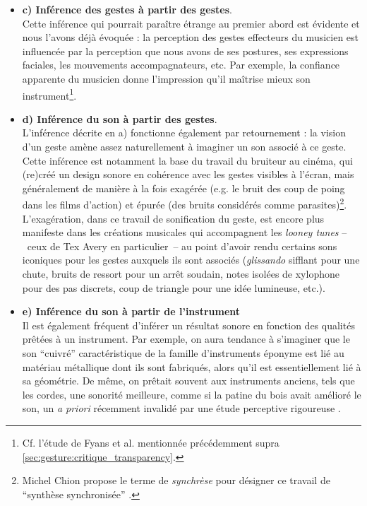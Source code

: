 \begin{itemize}[noitemsep]
	\item \textbf{c) Inférence des gestes à partir des gestes}.\\
	Cette inférence qui pourrait paraître étrange au premier abord est évidente et nous l'avons déjà évoquée : la perception des gestes effecteurs du musicien est influencée par la perception que nous avons de ses postures, ses expressions faciales, les mouvements accompagnateurs, etc. Par exemple, la confiance apparente du musicien donne l'impression qu'il maîtrise mieux son instrument\footnote{Cf. l'étude de Fyans et al. mentionnée précédemment supra \ref{sec:gesture:critique_transparency}.}.

	\item \textbf{d) Inférence du son à partir des gestes}.\\
	L'inférence décrite en a) fonctionne également par retournement : la vision d'un geste amène assez naturellement à imaginer un son associé à ce geste. Cette inférence est notamment la base du travail du bruiteur au cinéma, qui (re)créé un design sonore en cohérence avec les gestes visibles à l'écran, mais généralement de manière à la fois exagérée (e.g. le bruit des coup de poing dans les films d'action) et épurée (des bruits considérés comme parasites)\footnote{Michel Chion propose le terme de \textit{synchrèse} pour désigner ce travail de ``synthèse synchronisée'' \cite{chion_audio-vision:_2013}.}. L'exagération, dans ce travail de sonification du geste, est encore plus manifeste dans les créations musicales qui accompagnent les \textit{looney tunes} --~ceux de Tex Avery en particulier~-- au point d'avoir rendu certains sons iconiques pour les gestes auxquels ils sont associés (\textit{glissando} sifflant pour une chute, bruits de ressort pour un arrêt soudain, notes isolées de xylophone pour des pas discrets, coup de triangle pour une idée lumineuse, etc.).

	\item \textbf{e) Inférence du son à partir de l'instrument}\\
	Il est également fréquent d'inférer un résultat sonore en fonction des qualités prêtées à un instrument. Par exemple, on aura tendance à s'imaginer que le son ``cuivré'' caractéristique de la famille d'instruments éponyme est lié au matériau métallique dont ils sont fabriqués, alors qu'il est essentiellement lié à sa géométrie. De même, on prêtait souvent aux instruments anciens, tels que les cordes, une sonorité meilleure, comme si la patine du bois avait amélioré le son, un \textit{a priori} récemment invalidé par une étude perceptive rigoureuse \cite{fritz_listener_2017}.


\end{itemize}
